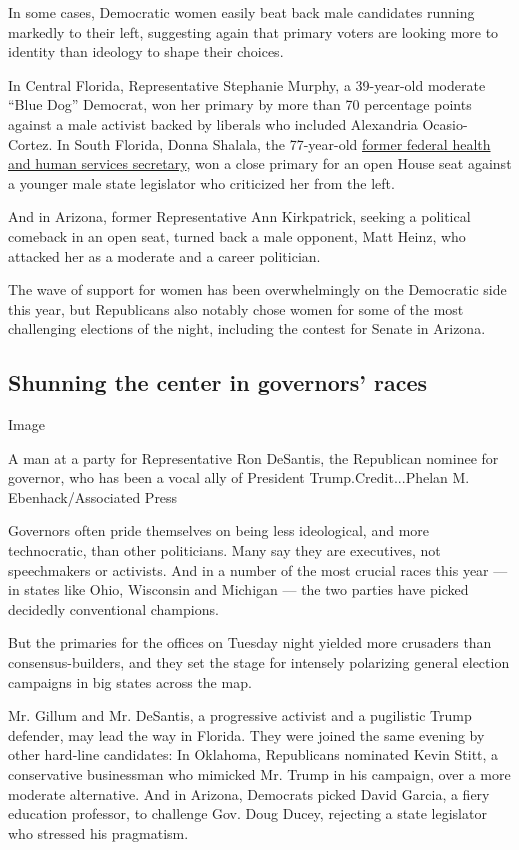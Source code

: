 In some cases, Democratic women easily beat back male candidates running
markedly to their left, suggesting again that primary voters are looking
more to identity than ideology to shape their choices.

In Central Florida, Representative Stephanie Murphy, a 39-year-old
moderate ``Blue Dog'' Democrat, won her primary by more than 70
percentage points against a male activist backed by liberals who
included Alexandria Ocasio-Cortez. In South Florida, Donna Shalala, the
77-year-old
\href{https://www.nytimes3xbfgragh.onion/2018/08/27/us/politics/donna-shalala-congress.html}{former
federal health and human services secretary}, won a close primary for an
open House seat against a younger male state legislator who criticized
her from the left.

And in Arizona, former Representative Ann Kirkpatrick, seeking a
political comeback in an open seat, turned back a male opponent, Matt
Heinz, who attacked her as a moderate and a career politician.

The wave of support for women has been overwhelmingly on the Democratic
side this year, but Republicans also notably chose women for some of the
most challenging elections of the night, including the contest for
Senate in Arizona.

\hypertarget{shunning-the-center-in-governors-races}{%
\subsection{Shunning the center in governors'
races}\label{shunning-the-center-in-governors-races}}

Image

A man at a party for Representative Ron DeSantis, the Republican nominee
for governor, who has been a vocal ally of President
Trump.Credit...Phelan M. Ebenhack/Associated Press

Governors often pride themselves on being less ideological, and more
technocratic, than other politicians. Many say they are executives, not
speechmakers or activists. And in a number of the most crucial races
this year --- in states like Ohio, Wisconsin and Michigan --- the two
parties have picked decidedly conventional champions.

But the primaries for the offices on Tuesday night yielded more
crusaders than consensus-builders, and they set the stage for intensely
polarizing general election campaigns in big states across the map.

Mr. Gillum and Mr. DeSantis, a progressive activist and a pugilistic
Trump defender, may lead the way in Florida. They were joined the same
evening by other hard-line candidates: In Oklahoma, Republicans
nominated Kevin Stitt, a conservative businessman who mimicked Mr. Trump
in his campaign, over a more moderate alternative. And in Arizona,
Democrats picked David Garcia, a fiery education professor, to challenge
Gov. Doug Ducey, rejecting a state legislator who stressed his
pragmatism.

